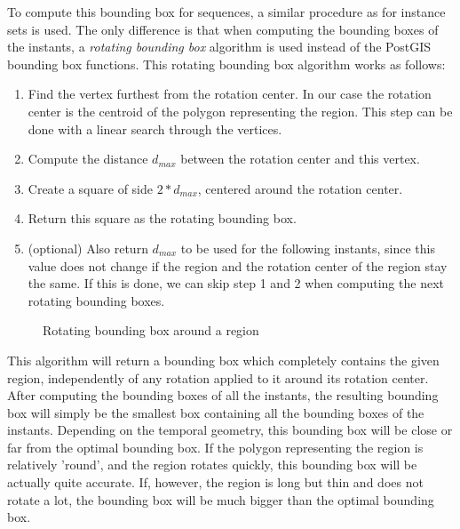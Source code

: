 To compute this bounding box for sequences, a similar procedure as for instance sets is used. The only difference is that when computing the bounding boxes of the instants, a \textit{rotating bounding box} algorithm is used instead of the PostGIS bounding box functions. This rotating bounding box algorithm works as follows:

\begin{enumerate}
    \item Find the vertex furthest from the rotation center. In our case the rotation center is the centroid of the polygon representing the region. This step can be done with a linear search through the vertices.
    \item Compute the distance $d_{max}$ between the rotation center and this vertex.
    \item Create a square of side $2*d_{max}$, centered around the rotation center.
    \item Return this square as the rotating bounding box.
    \item (optional) Also return $d_{max}$ to be used for the following instants, since this value does not change if the region and the rotation center of the region stay the same. If this is done, we can skip step 1 and 2 when computing the next rotating bounding boxes.
\end{enumerate}

\begin{figure}[h!]
    \centering
    \caption{Rotating bounding box around a region}
    \label{fig:rotating_bbox}
\end{figure}

This algorithm will return a bounding box which completely contains the given region, independently of any rotation applied to it around its rotation center. After computing the bounding boxes of all the instants, the resulting bounding box will simply be the smallest box containing all the bounding boxes of the instants. Depending on the temporal geometry, this bounding box will be close or far from the optimal bounding box. If the polygon representing the region is relatively 'round', and the region rotates quickly, this bounding box will be actually quite accurate. If, however, the region is long but thin and does not rotate a lot, the bounding box will be much bigger than the optimal bounding box.

